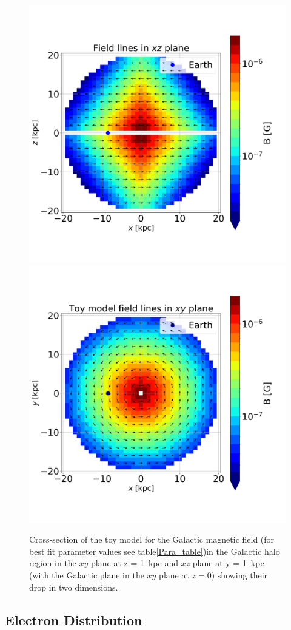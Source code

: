 \documentclass[usenatbib]{mnras}
\begin{document}
\begin{figure}
\centering
\includegraphics[width = 0.49\linewidth]{Images/ToyModel_BestFit_XZ.png}%
\includegraphics[width = 0.49\linewidth]{Images/ToyModel_BestFit_XY.png}
\caption{Cross-section of the toy model for the Galactic magnetic field (for best fit parameter values see table\ref{Para_table})in the Galactic halo region in the $xy$ plane at z = 1~kpc and $xz$ plane at y = 1~kpc (with the Galactic plane in the $xy$ plane at $z=0$) showing their drop in two dimensions.}
\label{fig:Vis_TM}
\end{figure}

\subsection{Electron Distribution}
\end{document}
